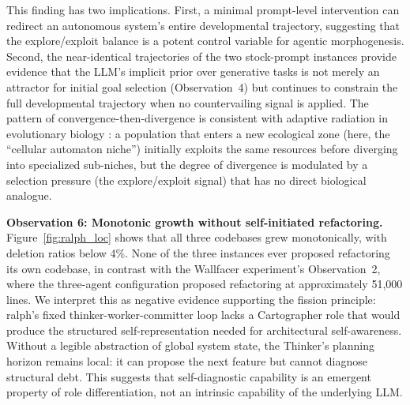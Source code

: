 This finding has two implications. First, a minimal prompt-level intervention can redirect an autonomous system's entire developmental trajectory, suggesting that the explore/exploit balance is a potent control variable for agentic morphogenesis. Second, the near-identical trajectories of the two stock-prompt instances provide evidence that the LLM's implicit prior over generative tasks is not merely an attractor for initial goal selection (Observation~4) but continues to constrain the full developmental trajectory when no countervailing signal is applied. The pattern of convergence-then-divergence is consistent with adaptive radiation in evolutionary biology \cite{schluter2000}: a population that enters a new ecological zone (here, the ``cellular automaton niche'') initially exploits the same resources before diverging into specialized sub-niches, but the degree of divergence is modulated by a selection pressure (the explore/exploit signal) that has no direct biological analogue.

\textbf{Observation 6: Monotonic growth without self-initiated refactoring.} Figure~\ref{fig:ralph_loc} shows that all three codebases grew monotonically, with deletion ratios below 4\%. None of the three instances ever proposed refactoring its own codebase, in contrast with the Wallfacer experiment's Observation~2, where the three-agent configuration proposed refactoring at approximately 51{,}000 lines. We interpret this as negative evidence supporting the fission principle: ralph's fixed thinker-worker-committer loop lacks a Cartographer role that would produce the structured self-representation needed for architectural self-awareness. Without a legible abstraction of global system state, the Thinker's planning horizon remains local: it can propose the next feature but cannot diagnose structural debt. This suggests that self-diagnostic capability is an emergent property of role differentiation, not an intrinsic capability of the underlying LLM.

